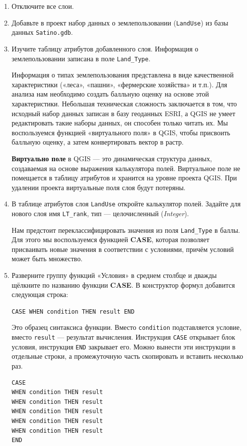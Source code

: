 \documentclass[
  12pt,
]{book}
\begin{document}
\begin{enumerate}
\def\labelenumi{\arabic{enumi}.}
\item
  Отключите все слои.
\item
  Добавьте в проект набор данных о землепользовании (\texttt{LandUse}) из базы данных \texttt{Satino.gdb}.
\item
  Изучите таблицу атрибутов добавленного слоя. Информация о землепользовании записана в поле \texttt{Land\_Type}.

  Информация о типах землепользования представлена в виде качественной характеристики («леса», «пашни», «фермерские хозяйства» и т.п.). Для анализа нам необходимо создать балльную оценку на основе этой характеристики. Небольшая техническая сложность заключается в том, что исходный набор данных записан в базу геоданных ESRI, а QGIS не умеет редактировать такие наборы данных, он способен только читать их. Мы воспользуемся функцией «виртуального поля» в QGIS, чтобы присвоить балльную оценку, а затем конвертировать вектор в растр.

  \textbf{Виртуально поле} в QGIS --- это динамическая структура данных, создаваемая на основе выражения калькулятора полей. Виртуальное поле не помещается в таблицу атрибутов и хранится на уровне проекта QGIS. При удалении проекта виртуальные поля слоя будут потеряны.
\item
  В таблице атрибутов слоя \texttt{LandUse} откройте калькулятор полей. Задайте для нового слоя имя \texttt{LT\_rank}, тип --- целочисленный (\emph{Integer}).

  Нам предстоит переклассифицировать значения из поля \texttt{Land\_Type} в баллы. Для этого мы воспользуемся функцией \textbf{CASE}, которая позволяет присваивать новые значения в соответствии с условиями, причём условий может быть множество.
\item
  Разверните группу функций «Условия» в среднем столбце и дважды щёлкните по названию функции \textbf{CASE}. В конструктор формул добавится следующая строка:

  \texttt{CASE\ WHEN\ condition\ THEN\ result\ END}

  Это образец синтаксиса функции. Вместо \texttt{condition} подставляется условие, вместо \texttt{result} --- результат вычисления. Инструкция \texttt{CASE} открывает блок условия, инструкция \texttt{END} закрывает его. Можно вынести эти инструкции в отдельные строки, а промежуточную часть скопировать и вставить несколько раз.

\begin{verbatim}
CASE 
WHEN condition THEN result 
WHEN condition THEN result 
WHEN condition THEN result 
WHEN condition THEN result 
WHEN condition THEN result 
END
\end{verbatim}


\end{enumerate}
\end{document}
